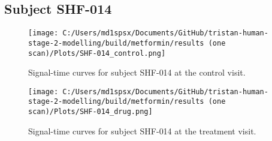 \documentclass{epflreport}%
\begin{document}
\subsection{Subject SHF{-}014}%
\label{subsec:SubjectSHF{-}014}%

%


\begin{figure}[h!]%
\centering%
\texttt{[image: C:/Users/md1spsx/Documents/GitHub/tristan-human-stage-2-modelling/build/metformin/results (one scan)/Plots/SHF-014\_control.png]}%
\caption{Signal{-}time curves for subject SHF{-}014 at the control visit.}%
\end{figure}

%


\begin{figure}[h!]%
\centering%
\texttt{[image: C:/Users/md1spsx/Documents/GitHub/tristan-human-stage-2-modelling/build/metformin/results (one scan)/Plots/SHF-014\_drug.png]}%
\caption{Signal{-}time curves for subject SHF{-}014 at the treatment visit.}%
\end{figure}
\end{document}
